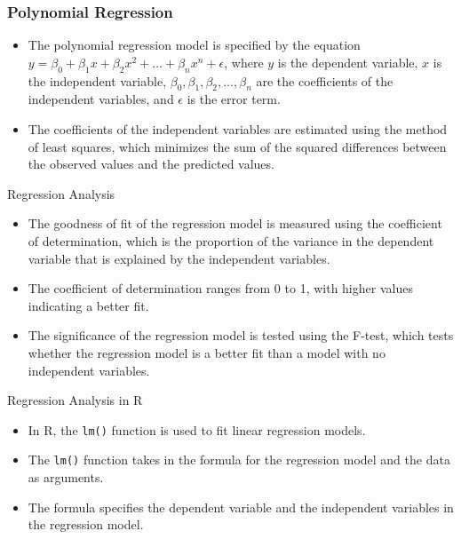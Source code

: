 \documentclass[serif, 9pt, aspectratio=32]{beamer}
\begin{document}
\begin{frame}
    \frametitle{Polynomial Regression}
    \begin{itemize}
        \setlength{\itemsep}{2em}
        \item The polynomial regression model is specified by the equation $y = \beta_0 + \beta_1 x + \beta_2 x^2 + \ldots + \beta_n x^n + \epsilon$, where $y$ is the dependent variable, $x$ is the independent variable, $\beta_0, \beta_1, \beta_2, \ldots, \beta_n$ are the coefficients of the independent variables, and $\epsilon$ is the error term.
        \item The coefficients of the independent variables are estimated using the method of least squares, which minimizes the sum of the squared differences between the observed values and the predicted values.
    \end{itemize}
\end{frame}

\begin{frame}{Regression Analysis}
    \begin{itemize}
        \setlength{\itemsep}{2em}
        \item The goodness of fit of the regression model is measured using the coefficient of determination, which is the proportion of the variance in the dependent variable that is explained by the independent variables.
        \item The coefficient of determination ranges from 0 to 1, with higher values indicating a better fit.
        \item The significance of the regression model is tested using the F-test, which tests whether the regression model is a better fit than a model with no independent variables.
    \end{itemize}
\end{frame}

\begin{frame}{Regression Analysis in R}
    \begin{itemize}
        \setlength{\itemsep}{2em}
        \item In R, the \texttt{lm()} function is used to fit linear regression models.
        \item The \texttt{lm()} function takes in the formula for the regression model and the data as arguments.
        \item The formula specifies the dependent variable and the independent variables in the regression model.
    \end{itemize}
\end{frame}
\end{document}

